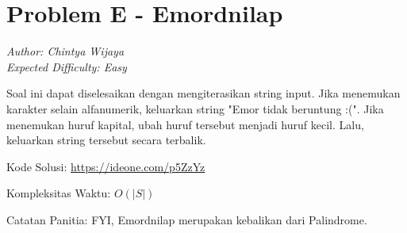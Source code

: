 \section*{Problem E - Emordnilap}
\textit{Author: Chintya Wijaya}
\\
\textit{Expected Difficulty: Easy}

Soal ini dapat diselesaikan dengan mengiterasikan string input. Jika menemukan karakter selain alfanumerik, keluarkan string "Emor tidak beruntung :(". Jika menemukan huruf kapital, ubah huruf tersebut menjadi huruf kecil. Lalu, keluarkan string tersebut secara terbalik.

Kode Solusi: \url{https://ideone.com/p5ZzYz}

Kompleksitas Waktu: $O(|S|)$

Catatan Panitia: FYI, Emordnilap merupakan kebalikan dari Palindrome.